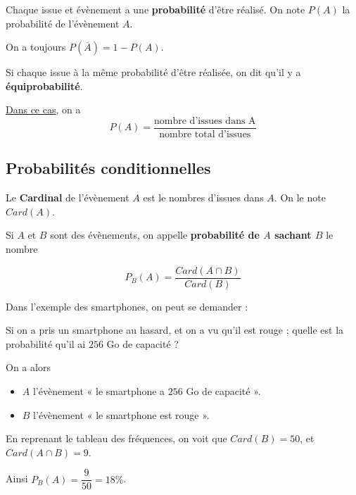 \documentclass[
	classe=$1^{ere} STI2D$,
	headerTitle=Cours\space Chapitre\space 3
]{coursclass}
\begin{document}
\begin{definition}[Probabilités]
	Chaque issue et évènement a une \textbf{probabilité} d'être réalisé. On note $P(A)$ la probabilité de l'évènement $A$.
\end{definition}

\begin{remarque}
	On a toujours $P(\overline{A}) = 1 - P(A)$.
\end{remarque}

\begin{propriete}[Probabilités]
	Si chaque issue à la même probabilité d'être réalisée, on dit qu'il y a \textbf{équiprobabilité}.

	\uline{Dans ce cas}, on a 
	$$ P(A) = \dfrac{\text{nombre d'issues dans A}}{\text{nombre total d'issues}} $$
\end{propriete}

\subsection*{Probabilités conditionnelles}

\begin{definition}[Cardinal]
	Le \textbf{Cardinal} de l'évènement $A$ est le nombres d'issues dans $A$. On le note $Card(A)$.
\end{definition}

\begin{definition}
	Si $A$ et $B$ sont des évènements, on appelle \textbf{probabilité de $A$ sachant $B$} le nombre

	$$ P_B(A) = \dfrac{Card(A ∩ B)}{Card(B)} $$
\end{definition}

\begin{exemple}
	Dans l'exemple des smartphones, on peut se demander : 

	Si on a pris un smartphone au hasard, et on a vu qu'il est rouge ; quelle est la probabilité qu'il ai $256$ Go de capacité ? \medskip

	On a alors
	\begin{itemize}
		\item $A$ l'évènement « le smartphone a $256$ Go de capacité ».
		\item $B$ l'évènement « le smartphone est rouge ».
	\end{itemize}

	En reprenant le tableau des fréquences, on voit que $Card(B) = 50$, et $Card(A ∩ B) = 9$.

	Ainsi $P_B(A) = \dfrac{9}{50} = 18\%$.
\end{exemple}
\end{document}

